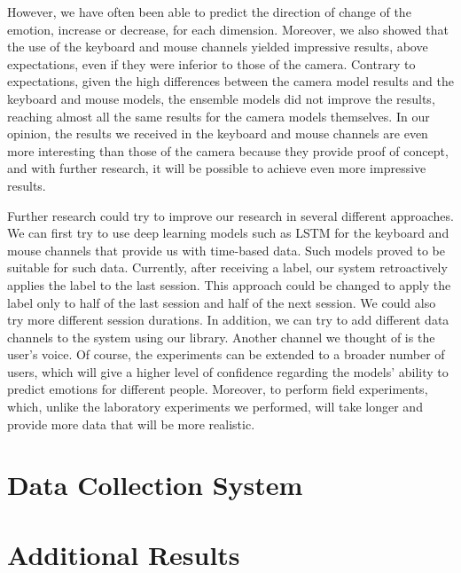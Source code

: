 \documentclass{article}
\begin{document}
However, we have often been able to predict the direction of change of the emotion, increase or decrease, for each dimension.
Moreover, we also showed that the use of the keyboard and mouse channels yielded impressive results, above expectations, 
even if they were inferior to those of the camera. Contrary to expectations, given the high differences between the camera model 
results and the keyboard and mouse models, the ensemble models did not improve the results, reaching almost all the same results for the 
camera models themselves. In our opinion, the results we received in the keyboard and mouse channels are even more interesting than those of 
the camera because they provide proof of concept, and with further research, it will be possible to achieve even more impressive results.

Further research could try to improve our research in several different approaches. 
We can first try to use deep learning models such as LSTM for the keyboard and mouse channels that provide us with time-based data. 
Such models proved to be suitable for such data. Currently, after receiving a label, our system retroactively applies the label to the last session. 
This approach could be changed to apply the label only to half of the last session and half of the next session. We could also try more different session durations. 
In addition, we can try to add different data channels to the system using our library. Another channel we thought of is the user's voice. 
Of course, the experiments can be extended to a broader number of users, which will give a higher level of confidence regarding the models' 
ability to predict emotions for different people. Moreover, to perform field experiments, which, unlike the laboratory experiments we performed, 
will take longer and provide more data that will be more realistic.

\newpage




\newpage

\begin{appendices}
  \section{Data Collection System} \label{appendix:collection_system}
  
  
  \newpage

  \section{Additional Results} \label{appendix:additional_results}
  
\end{appendices}
\end{document}
